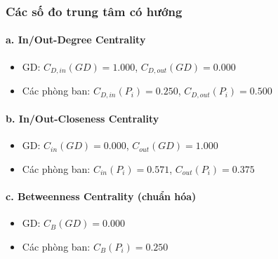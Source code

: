 \documentclass[12pt,a4paper]{article}
\begin{document}
\subsubsection{Các số đo trung tâm có hướng}
\paragraph{a. In/Out-Degree Centrality}
\begin{itemize}
\item GD: $C_{D,in}(GD) = 1.000$, $C_{D,out}(GD) = 0.000$
\item Các phòng ban: $C_{D,in}(P_i) = 0.250$, $C_{D,out}(P_i) = 0.500$
\end{itemize}

\paragraph{b. In/Out-Closeness Centrality}
\begin{itemize}
\item GD: $C_{in}(GD) = 0.000$, $C_{out}(GD) = 1.000$
\item Các phòng ban: $C_{in}(P_i) = 0.571$, $C_{out}(P_i) = 0.375$
\end{itemize}

\paragraph{c. Betweenness Centrality (chuẩn hóa)}
\begin{itemize}
\item GD: $C_B(GD) = 0.000$
\item Các phòng ban: $C_B(P_i) = 0.250$
\end{itemize}
\end{document}
